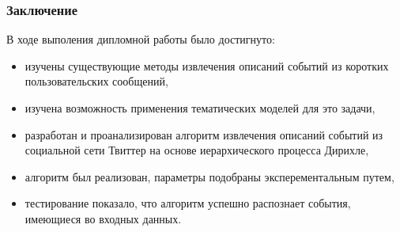 \documentclass[10pt,pdf,hyperref={unicode}]{beamer}
\begin{document}
\begin{frame}
  \frametitle{Заключение}
  В ходе выполения дипломной работы было достигнуто:
	\begin{itemize}
	\item изучены существующие методы извлечения описаний событий из коротких пользовательских сообщений,
	\item изучена возможность применения тематических моделей для это задачи,
	\item разработан и проанализирован алгоритм извлечения описаний событий из социальной сети Твиттер на основе иерархического процесса Дирихле,
	\item алгоритм был реализован, параметры подобраны эксперементальным путем,
	\item тестирование показало, что алгоритм успешно распознает события, имеющиеся во входных данных.
	\end{itemize}
\end{frame}
\end{document}
